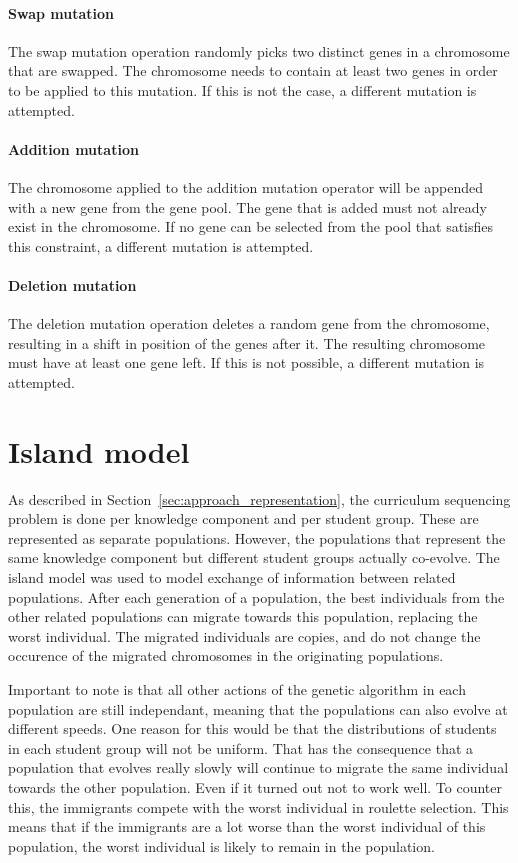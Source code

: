 \paragraph{Swap mutation} The swap mutation operation randomly picks two
distinct genes in a chromosome that are swapped. The chromosome needs to
contain at least two genes in order to be applied to this mutation. If this is
not the case, a different mutation is attempted.

\paragraph{Addition mutation} The chromosome applied to the addition mutation
operator will be appended with a new gene from the gene pool. The gene that is
added must not already exist in the chromosome. If no gene can be selected from
the pool that satisfies this constraint, a different mutation is attempted.

\paragraph{Deletion mutation} The deletion mutation operation deletes a random
gene from the chromosome, resulting in a shift in position of the genes after
it. The resulting chromosome must have at least one gene left. If this is not
possible, a different mutation is attempted.

\section{Island model}
\label{sec:approach_island_model}
As described in Section~\ref{sec:approach_representation}, the curriculum
sequencing problem is done per knowledge component and per student group. These
are represented as separate populations. However, the populations that
represent the same knowledge component but different student groups actually
co-evolve. The island model was used to model exchange of information between
related populations. After each generation of a population, the best
individuals from the other related populations can migrate towards this
population, replacing the worst individual. The migrated individuals are
copies, and do not change the occurence of the migrated chromosomes in the
originating populations.

Important to note is that all other actions of the genetic algorithm in each
population are still independant, meaning that the populations can also evolve
at different speeds. One reason for this would be that the distributions of
students in each student group will not be uniform. That has the consequence
that a population that evolves really slowly will continue to migrate the same
individual towards the other population. Even if it turned out not to work
well. To counter this, the immigrants compete with the worst individual in
roulette selection. This means that if the immigrants are a lot worse than the
worst individual of this population, the worst individual is likely to remain
in the population.

